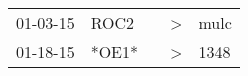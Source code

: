 \begin{supertabular}{p{0.07\textwidth}p{0.06\textwidth}p{0.02\textwidth}p{0.02\textwidth}p{0.06\textwidth}}
 01-03-15\textsuperscript{} &  ROC2\textsuperscript{} &   &  \textgreater &  mulc\textsuperscript{} \\
 01-18-15\textsuperscript{} &                   *OE1* &   &  \textgreater &  1348\textsuperscript{} \\
\end{supertabular}
